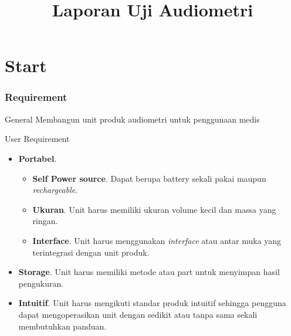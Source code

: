 \documentclass[table,dvipsnames,10pt]{beamer}
\title[Audiometri Development]{Laporan Uji Audiometri}
\author{}
\institute[VibrasticLab : \ccbysa]{
	Achmadi ST MT\\
	\medskip
	\textit{}
}
\date{}
\begin{document}
	\section{Start}
	
	\begin{frame}
	\titlepage
	\end{frame}

	\begin{frame}
	\frametitle{Requirement}
	
	\begin{exampleblock}{General}
		Membangun unit produk audiometri untuk penggunaan medis 
	\end{exampleblock}

	\begin{exampleblock}{User Requirement}
	\begin{itemize}
		\item \textbf{Portabel}. 
		\begin{itemize}
			\item \textbf{Self Power source}. Dapat berupa battery sekali pakai maupun \textit{rechargeable}.
			
			\item \textbf{Ukuran}. Unit harus memiliki ukuran volume kecil dan massa yang ringan.
						
			\item \textbf{Interface}. Unit harus menggunakan \textit{interface} atau antar muka yang terintegrasi dengan unit produk.
			
		\end{itemize}
		
		\item \textbf{Storage}. Unit harus memiliki metode atau part untuk menyimpan hasil pengukuran.
		
		\item \textbf{Intuitif}. Unit harus mengikuti standar produk intuitif sehingga pengguna
		dapat mengoperasikan unit dengan sedikit atau tanpa sama sekali membutuhkan panduan.
	\end{itemize}
	\end{exampleblock}
	\end{frame}
\end{document}
